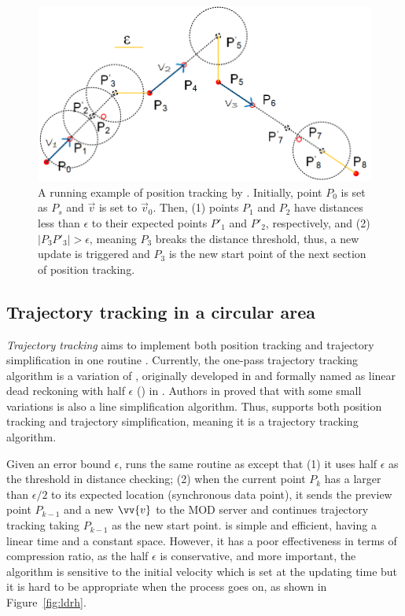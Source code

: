 
\begin{figure}[tb!]
	\centering
	\includegraphics[scale=0.9]{figures/Fig-LDR.png}
	\vspace{-1ex}
	\caption{\small A running example of position tracking by \ldr. Initially, point $P_0$ is set as $P_s$ and $\vec{v}$ is set to $\vec{v}_0$. Then, (1) points $P_1$ and $P_2$ have \sed distances less than $\epsilon$ to their expected points $P'_1$ and $P'_2$, respectively, and (2) $|P_3P'_3| > \epsilon$, meaning $P_3$ breaks the distance threshold, thus, a new update is triggered and $P_3$ is the new start point of the next section of position tracking.}
	\vspace{-2ex}
	\label{fig:ldr}
\end{figure}



\subsection{Trajectory tracking in a circular area}
\textit{Trajectory tracking} aims to implement both position tracking and trajectory simplification in one routine \cite{Lange:Tracking}. Currently, the one-pass trajectory tracking algorithm is a variation of \ldr, originally developed in \cite{Trajcevski:LDRH} and formally named as linear dead reckoning with half $\epsilon$ (\ldrh) in \cite{Lange:Tracking}.
%
Authors in \cite{Trajcevski:LDRH} proved that \ldr with some small variations is also a line simplification algorithm. Thus, \ldrh supports both position tracking and trajectory simplification, meaning it is a trajectory tracking algorithm.

Given an error bound $\epsilon$, \ldrh runs the same routine as \ldr except that (1) it uses half $\epsilon$ as the threshold in distance checking; (2) when the current point $P_k$ has a \sed larger than $\epsilon/2$ to its expected location (synchronous data point), it sends the preview point $P_{k-1}$ and a new $\vv{v}$ to the MOD server and continues trajectory tracking taking $P_{k-1}$ as the new start point. \ldrh is simple and efficient, having a linear time and a constant space. However, it has a poor effectiveness in terms of compression ratio, as the half $\epsilon$ is conservative, and more important, the algorithm is sensitive to the initial velocity which is set at the updating time but it is hard to be appropriate when the process goes on, as shown in Figure~\ref{fig:ldrh}.

